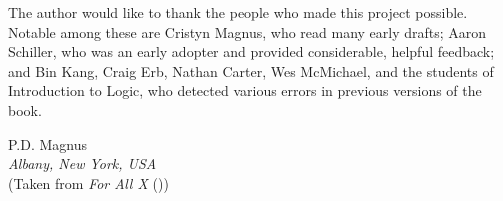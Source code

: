 \vspace{3cm}


\noindent The author would like to thank the people who made this project possible. Notable among these are Cristyn Magnus, who read many early drafts; Aaron Schiller, who was an early adopter and provided considerable, helpful feedback; {and} Bin Kang, Craig Erb, Nathan Carter, Wes McMichael, and the students of Introduction to Logic, who detected various errors in previous versions of the book.


\begin{adjustwidth}{2em}{0em}
P.D. Magnus \\
\noindent\emph{Albany, New York, USA}\\
\noindent(Taken from \emph{For All X} (\citeyear{Magnus2008}))
\end{adjustwidth}
